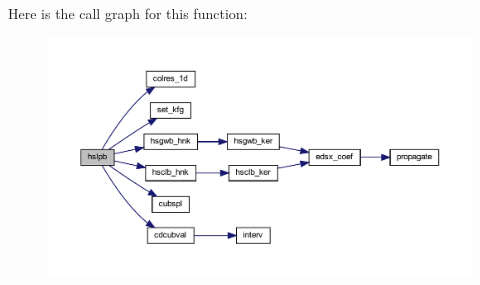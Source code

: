 Here is the call graph for this function\+:\nopagebreak
\begin{figure}[H]
\begin{center}
\leavevmode
\includegraphics[width=350pt]{Leroi__c_8f90_a247cf958ed9d5aa90d05eee29e6a9582_cgraph}
\end{center}
\end{figure}
\mbox{\label{Leroi__c_8f90_a918a25836d554d239ee900a00fbefbb6}} 
